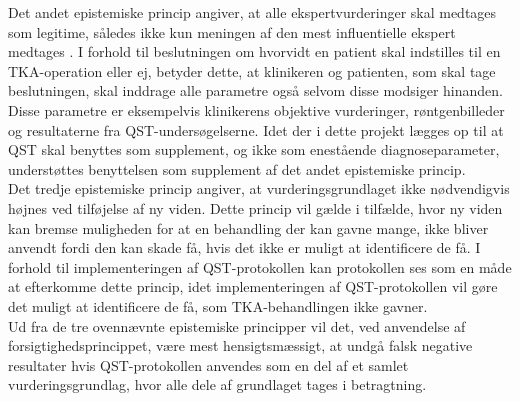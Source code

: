 Det andet epistemiske princip angiver, at alle ekspertvurderinger skal medtages som legitime, således ikke kun meningen af den mest influentielle ekspert medtages \citep{Peterson2007}. I forhold til beslutningen om hvorvidt en patient skal indstilles til en TKA-operation eller ej, betyder dette, at klinikeren og patienten, som skal tage beslutningen, skal inddrage alle parametre også selvom disse modsiger hinanden. Disse parametre er eksempelvis klinikerens objektive vurderinger, røntgenbilleder og resultaterne fra QST-undersøgelserne. Idet der i dette projekt lægges op til at QST skal benyttes som supplement, og ikke som enestående diagnoseparameter, understøttes benyttelsen som supplement af det andet epistemiske princip. \\
Det tredje epistemiske princip angiver, at vurderingsgrundlaget ikke nødvendigvis højnes ved tilføjelse af ny viden. Dette princip vil gælde i tilfælde, hvor ny viden kan bremse muligheden for at en behandling der kan gavne mange, ikke bliver anvendt fordi den kan skade få, hvis det ikke er muligt at identificere de få. \citep{Peterson2007} I forhold til implementeringen af QST-protokollen kan protokollen ses som en måde at efterkomme dette princip, idet implementeringen af QST-protokollen vil gøre det muligt at identificere de få, som TKA-behandlingen ikke gavner. \\
Ud fra de tre ovennævnte epistemiske principper vil det, ved anvendelse af forsigtighedsprincippet, være mest hensigtsmæssigt, at undgå falsk negative resultater hvis QST-protokollen anvendes som en del af et samlet vurderingsgrundlag, hvor alle dele af grundlaget tages i betragtning.

